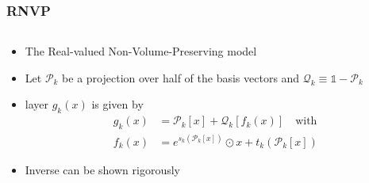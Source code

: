 \begin{frame}
    \frametitle{RNVP}
    \begin{columns}
        \begin{column}[t]{0.48\textwidth}
            \begin{itemize}[<+->]
                \setlength\itemsep{.8em}
                \item The Real-valued Non-Volume-Preserving model
                \item Let $\mathcal{P}_k$ be a projection over half of the basis vectors and $\mathcal{Q}_k \equiv \mathbb{1} - \mathcal{P}_k$
                \item layer $g_k(x)$ is given by 
                \begin{equation}
                    \begin{split}
                        g_k(x) &= \mathcal{P}_k[x] + \mathcal{Q}_k [f_k(x)] \quad \text{with}\\
                        f_k(x) &=  e^{s_k(\mathcal{P}_k[x])} \odot x + t_k(\mathcal{P}_k[x])
                    \end{split}
                    \label{eq:layer_RNVP}
                \end{equation}
                \item Inverse can be shown rigorously
            \end{itemize}
        \end{column}


\end{columns}
\end{frame}

